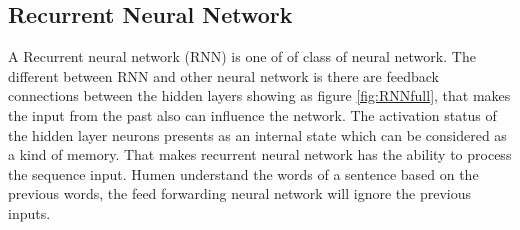 \subsection{Recurrent Neural Network} %

A Recurrent neural network (RNN) is one of of class of neural network. The different between RNN and other neural network is there are feedback connections between the hidden layers showing as figure \ref{fig:RNNfull}, that makes the input from the past also can influence the network. The activation status of the hidden layer neurons presents as an internal state which can be considered as a kind of memory. That makes recurrent neural network has the ability to process the sequence input. Humen understand the words of a sentence based on the previous words, the feed forwarding neural network will ignore the previous inputs.


